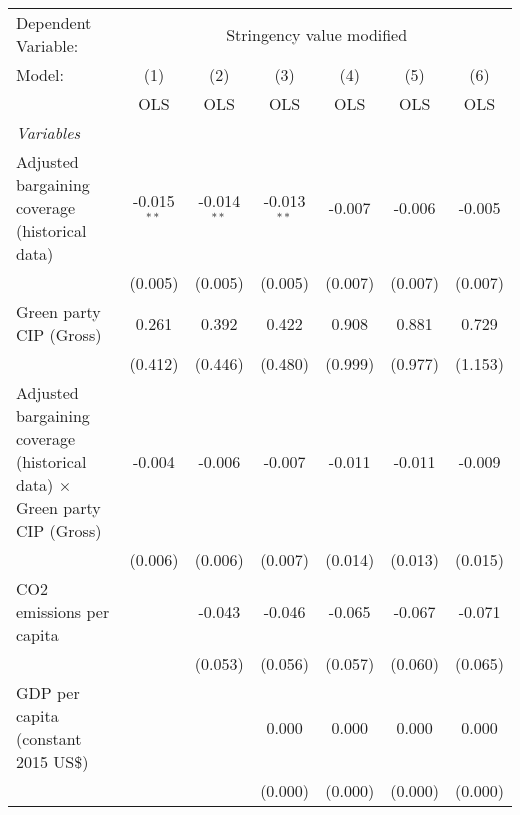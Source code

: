 
\begingroup
\centering
\begin{tabular}{lcccccc}
   \toprule
   Dependent Variable: & \multicolumn{6}{c}{Stringency value modified}\\
   Model:                                                                           & (1)           & (2)           & (3)           & (4)     & (5)     & (6)\\  
                                                                                    &  OLS          & OLS           & OLS           & OLS     & OLS     & OLS\\  
   \midrule
   \emph{Variables}\\
   Adjusted bargaining coverage (historical data)                                   & -0.015$^{**}$ & -0.014$^{**}$ & -0.013$^{**}$ & -0.007  & -0.006  & -0.005\\   
                                                                                    & (0.005)       & (0.005)       & (0.005)       & (0.007) & (0.007) & (0.007)\\   
   Green party CIP (Gross)                                                          & 0.261         & 0.392         & 0.422         & 0.908   & 0.881   & 0.729\\   
                                                                                    & (0.412)       & (0.446)       & (0.480)       & (0.999) & (0.977) & (1.153)\\   
   Adjusted bargaining coverage (historical data) $\times$ Green party CIP (Gross)  & -0.004        & -0.006        & -0.007        & -0.011  & -0.011  & -0.009\\   
                                                                                    & (0.006)       & (0.006)       & (0.007)       & (0.014) & (0.013) & (0.015)\\   
   CO2 emissions per capita                                                         &               & -0.043        & -0.046        & -0.065  & -0.067  & -0.071\\   
                                                                                    &               & (0.053)       & (0.056)       & (0.057) & (0.060) & (0.065)\\   
   GDP per capita (constant 2015 US\$)                                              &               &               & 0.000         & 0.000   & 0.000   & 0.000\\   
                                                                                    &               &               & (0.000)       & (0.000) & (0.000) & (0.000)\\   

\end{tabular}
